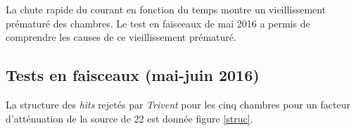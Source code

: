 La chute rapide du courant en fonction du temps montre un vieillissement prématuré des chambres. Le test en faisceaux de mai 2016 a permis de comprendre les causes de ce vieillissement prématuré.

\subsection{Tests en faisceaux (mai-juin 2016)}
\label{GIFFF2}
La structure des \textit{hits} rejetés par \textit{Trivent} pour les cinq chambres pour un facteur d'atténuation de la source de \num{22} est donnée figure \ref{struc}.
\begin{figure}[ht!]
	\centering
	\hfill
	\\
	\vspace{0.7cm}
	\hfill

\end{figure}
